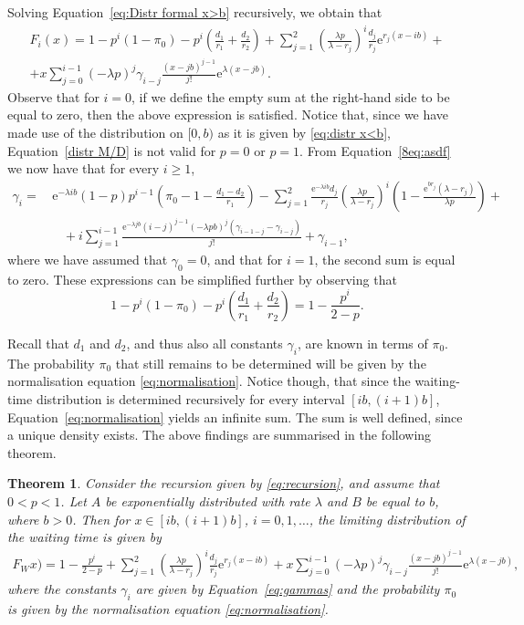 \documentclass[reqno, 11pt, a4paper]{article}
\theoremstyle{plain}
\newtheorem{theorem}{Theorem}
\theoremstyle{remark}
\numberwithin{equation}{section}
\begin{document}
Solving Equation~\eqref{eq:Distr formal x>b} recursively, we obtain that
\begin{multline}\label{distr M/D}
F_i(x)=1-p^i(1-\pi_0)-p^i\left(\frac{d_1}{r_1}+\frac{d_2}{r_2}\right)+\sum_{j=1}^2 \left(\frac{\lambda  p}{\lambda
-r_j}\right)^i \frac{d_j }{r_j} \mathrm{e}^{r_j (x-ib)}+\\
+x\sum_{j=0}^{i-1}(-\lambda p)^j \gamma_{i-j} \frac{(x-j b)^{j-1}}{j!} \mathrm{e}^{\lambda (x-jb)}.
\end{multline}
Observe that for $i=0$, if we define the empty sum at the right-hand side to be equal to zero, then the above expression is satisfied. Notice that, since we have made use of the distribution on $[0,b)$ as it is given by \eqref{eq:distr x<b}, Equation~\eqref{distr M/D} is not valid for $p=0$ or $p=1$. From Equation~\eqref{8eq:asdf} we now have that for every $i\geqslant 1$,
\begin{align}\label{eq:gammas}
\nonumber \gamma_i=&\,\mathrm{e}^{-\lambda i b}(1-p)p^{i-1}\left(\pi_0-1-\frac{d_1-d_2}{r_1}\right)-\sum_{j=1}^2 \frac{\mathrm{e}^{-\lambda i b}d_j }{r_j}\left(\frac{\lambda  p}{\lambda
-r_j}\right)^i\left(1-\frac{\mathrm{e}^{b r_j}\left(\lambda -r_j\right)}{\lambda  p}\right)+\\
&\quad+i \sum _{j=1}^{i-1} \frac{\mathrm{e}^{-\lambda  j b}(i-j)^{j-1}(-\lambda  p b)^j \left(\gamma _{i-1-j}-\gamma _{i-j}\right)}{j!}+\gamma_{i-1},
\end{align}
where we have assumed that $\gamma_0=0$, and that for $i=1$, the second sum is equal to zero. These expressions can be simplified further by observing that
$$
1-p^i(1-\pi_0)-p^i\left(\frac{d_1}{r_1}+\frac{d_2}{r_2}\right)=1-\frac{p^i}{2-p}.
$$

Recall that $d_1$ and $d_2$, and thus also all constants $\gamma_i$, are known in terms of $\pi_0$. The probability $\pi_0$ that still remains to be determined will be given by the normalisation equation \eqref{eq:normalisation}. Notice though, that since the waiting-time distribution is determined recursively for every interval $[ib,(i+1)b]$, Equation~\eqref{eq:normalisation} yields an infinite sum. The sum is well defined, since a unique density exists. The above findings are summarised in the following theorem.
\begin{theorem}\label{th:distr M/D}
Consider the recursion given by \eqref{eq:recursion}, and assume that $0<p<1$. Let $A$ be exponentially distributed with rate $\lambda$ and $B$ be equal to $b$, where $b>0$. Then for $x\in [ib,(i+1)b]$, $i=0,1,\ldots$, the limiting distribution of the waiting time is given by
\begin{multline*}
{\mbox{$F_W^{}$}}x)=1-\frac{p^i}{2-p}+\sum_{j=1}^2 \left(\frac{\lambda p}{\lambda -r_j}\right)^i \frac{d_j }{r_j} \mathrm{e}^{r_j (x-ib)}+x\sum_{j=0}^{i-1}(-\lambda p)^j \gamma_{i-j} \frac{(x-j b)^{j-1}}{j!} \mathrm{e}^{\lambda (x-jb)},
\end{multline*}
where the constants $\gamma_i$ are given by Equation~\eqref{eq:gammas} and the probability $\pi_0$ is given by the normalisation equation \eqref{eq:normalisation}.
\end{theorem}
\end{document}
